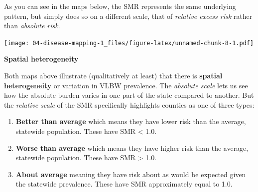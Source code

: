 \documentclass[
]{book}
\newenvironment{Shaded}{\begin{snugshade}}{\end{snugshade}}
\newcommand{\AttributeTok}[1]{\textcolor[rgb]{0.13,0.29,0.53}{#1}}
\newcommand{\CommentTok}[1]{\textcolor[rgb]{0.56,0.35,0.01}{\textit{#1}}}
\newcommand{\FunctionTok}[1]{\textcolor[rgb]{0.13,0.29,0.53}{\textbf{#1}}}
\newcommand{\NormalTok}[1]{#1}
\newcommand{\OtherTok}[1]{\textcolor[rgb]{0.56,0.35,0.01}{#1}}
\newcommand{\SpecialCharTok}[1]{\textcolor[rgb]{0.81,0.36,0.00}{\textbf{#1}}}
\providecommand{\tightlist}{%
  \setlength{\itemsep}{0pt}\setlength{\parskip}{0pt}}
\newenvironment{rmdtip}[1]
  {
  \begin{itemize}
  \renewcommand{\labelitemi}{
    \raisebox{-.7\height}[0pt][0pt]{
      {\setkeys{Gin}{width=3em,keepaspectratio}\texttt{[image: images/\#1]}}
    }
  }
  \setlength{\fboxsep}{1em}
  \begin{tip}
  \item
  }
  {
  \end{tip}
  \end{itemize}
  }
\begin{document}
\begin{Shaded}
\end{Shaded}

As you can see in the maps below, the SMR represents the same underlying pattern, but simply does so on a different scale, that of \emph{relative excess risk} rather than \emph{absolute risk}.

\texttt{[image: 04-disease-mapping-1\_files/figure-latex/unnamed-chunk-8-1.pdf]}

\begin{rmdtip}{tip}

\textbf{Spatial heterogeneity}

Both maps above illustrate (qualitatively at least) that there is \textbf{spatial heterogeneity} or variation in VLBW prevalence. The \emph{absolute scale} lets us see how the absolute burden varies in one part of the state compared to another. But the \emph{relative scale} of the SMR specifically highlights counties as one of three types:

\begin{enumerate}
\def\labelenumi{\arabic{enumi}.}
\tightlist
\item
  \textbf{Better than average} which means they have lower risk than the average, statewide population. These have SMR \textless{} 1.0.
\item
  \textbf{Worse than average} which means they have higher risk than the average, statewide population. These have SMR \textgreater{} 1.0.
\item
  \textbf{About average} meaning they have risk about as would be expected given the statewide prevalence. These have SMR approximately equal to 1.0.
\end{enumerate}

\end{rmdtip}
\end{document}
